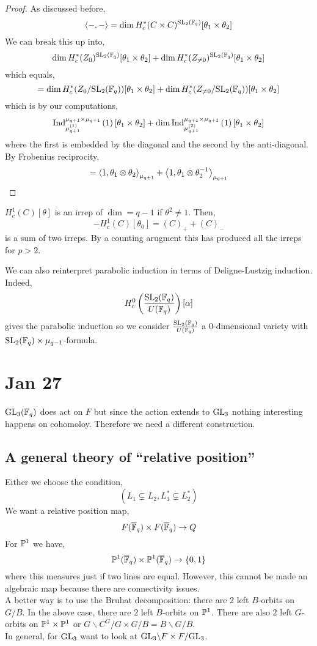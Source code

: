 \documentclass[12pt]{article}
\begin{document}
\begin{proof}
As discussed before,
\[ \inner{-}{-} = \dim H^*_c(C \times C)^{ \SL_2(\FF_q)} [\theta_1 \times \theta_2] \]
We can break this up into,
\[ \dim H^*_c(Z_0)^{\SL_2(\FF_q)}[\theta_1 \times \theta_2] + \dim H^*_c(Z_{\neq 0})^{\SL_2(\FF_q)}[\theta_1 \times \theta_2] \]
which equals,
\[ = \dim H^*_c(Z_0 / \SL_2(\FF_q))[\theta_1 \times \theta_2] + \dim H^*_c(Z_{\neq 0} / \SL_2(\FF_q))[\theta_1 \times \theta_2] \]
which is by our computations,
\[ \Ind{\mu_{q+1} \times \mu_{q+1}}{\mu_{q+1}^{(1)}}{1} [\theta_1 \times \theta_2] + \dim \Ind{\mu_{q+1} \times \mu_{q+1}}{\mu_{q+1}^{(2)}}{1} [\theta_1 \times \theta_2] \] 
where the first is embedded by the diagonal and the second by the anti-diagonal. By Frobenius reciprocity,
\[ = \inner{1}{\theta_1 \ot \theta_2}_{\mu_{q+1}} + \inner{1}{\theta_1 \ot \theta_2^{-1}}_{\mu_{q+1}} \]
\end{proof}

\begin{cor}
$H^1_c(C)[\theta]$ is an irrep of $\dim = q - 1$ if $\theta^2 \neq 1$. Then,
\[ - H^1_c(C) [ \theta_0 ] = (C)_+ + (C)_- \]
is a sum of two irreps. By a counting arugment this has produced all the irreps for $p > 2$. 
\end{cor}

\begin{rmk}
We can also reinterpret parabolic induction in terms of Deligne-Lustzig induction. Indeed, 
\[ H^0_c \left( \frac{\SL_2(\FF_q)}{U(\FF_q)} \right) [\alpha] \]
gives the parabolic induction so we consider $\frac{\SL_2(\FF_q)}{U(\FF_q)}$ a $0$-dimensional variety with $\SL_2(\FF_q) \times \mu_{q-1}$-formula. 
\end{rmk}

\section{Jan 27}

$\GL_3(\FF_q)$ does act on $F$ but since the action extends to $\GL_3$ nothing interesting happens on cohomoloy. Therefore we need a different construction.

\subsection{A general theory of ``relative position''}

Either we choose the condition,
\[ (L_1 \subsetneq L_2, L_1^* \subsetneq L_2^*) \]
We want a relative position map,
\[ F(\FFbar_q) \times F(\FFbar_q) \to Q \]
For $\P^1$ we have,
\[ \P^1(\FFbar_q) \times \P^1(\FFbar_q) \to \{ 0, 1 \} \]
where this measures just if two lines are equal. However, this cannot be made an algebraic map because there are connectivity issues. 
\bigskip\\
A better way is to use the Bruhat decomposition: there are 2 left $B$-orbits on $G/B$. In the above case, there are $2$ left $B$-orbits on $\P^1$. There are also $2$ left $G$-orbits on $\P^1 \times \P^1$ or $G \backslash C^G / G \times G / B = B \backslash G / B$. 
\bigskip\\
In general, for $\GL_3$ want to look at $\GL_3 \backslash F \times F / \GL_3$. 
\end{document}
